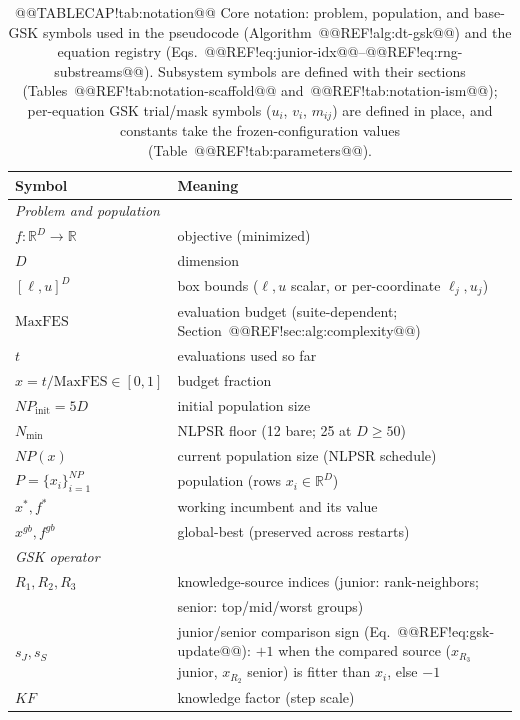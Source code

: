 \documentclass[10pt,a4paper]{article}
\begin{document}
\begin{table}[t]
\caption{@@TABLECAP!tab:notation@@ Core notation: problem, population, and base-GSK symbols used in the
pseudocode (Algorithm~@@REF!alg:dt-gsk@@) and the equation registry
(Eqs.~@@REF!eq:junior-idx@@--@@REF!eq:rng-substreams@@). Subsystem symbols are
defined with their sections (Tables~@@REF!tab:notation-scaffold@@
and~@@REF!tab:notation-ism@@); per-equation GSK trial/mask symbols ($u_i$, $v_i$,
$m_{ij}$) are defined in place, and constants take the frozen-configuration
values (Table~@@REF!tab:parameters@@).}
\label{tab:notation}
\footnotesize
\begin{tabular}{@{}l@{\hspace{1.2em}}p{}@{}}
\toprule
\textbf{Symbol} & \textbf{Meaning}\\
\midrule
\multicolumn{2}{l}{\emph{Problem and population}}\\
\midrule
$f:\mathbb{R}^D\to\mathbb{R}$ & objective (minimized)\\
$D$ & dimension\\
$[\ell,u]^D$ & box bounds ($\ell,u$ scalar, or per-coordinate $\ell_j,u_j$)\\
$\text{MaxFES}$ & evaluation budget (suite-dependent; Section~@@REF!sec:alg:complexity@@)\\
$t$ & evaluations used so far\\
$x = t/\text{MaxFES}\in[0,1]$ & budget fraction\\
$NP_{\text{init}} = 5D$ & initial population size\\
$N_{\min}$ & NLPSR floor (12 bare; 25 at $D\ge50$)\\
$NP(x)$ & current population size (NLPSR schedule)\\
$P=\{x_i\}_{i=1}^{NP}$ & population (rows $x_i\in\mathbb{R}^D$)\\
$x^{*}, f^{*}$ & working incumbent and its value\\
$x^{gb}, f^{gb}$ & global-best (preserved across restarts)\\
\midrule
\multicolumn{2}{l}{\emph{GSK operator}}\\
\midrule
$R_1,R_2,R_3$ & knowledge-source indices (junior: rank-neighbors;\\
              & \quad senior: top/mid/worst groups)\\
$s_J,s_S$ & junior/senior comparison sign (Eq.~@@REF!eq:gsk-update@@): $+1$ when
the compared source ($x_{R_3}$ junior, $x_{R_2}$ senior) is fitter than $x_i$,
else $-1$\\
$KF$ & knowledge factor (step scale)\\

\end{tabular}
\end{table}
\end{document}

